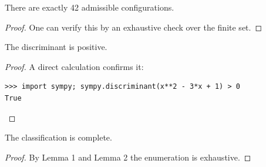 \documentclass{article}
\begin{document}
\begin{lemma}\label{lem:count}
There are exactly 42 admissible configurations.
\end{lemma}
\begin{proof}
One can verify this by an exhaustive check over the finite set.
\end{proof}

\begin{lemma}\label{lem:checked}
The discriminant is positive.
\end{lemma}
\begin{proof}
A direct calculation confirms it:
\begin{verbatim}
>>> import sympy; sympy.discriminant(x**2 - 3*x + 1) > 0
True
\end{verbatim}
\end{proof}

\begin{theorem}\label{thm:fin}
The classification is complete.
\end{theorem}
\begin{proof}
By Lemma 1 and Lemma 2 the enumeration is exhaustive.
\end{proof}
\end{document}
